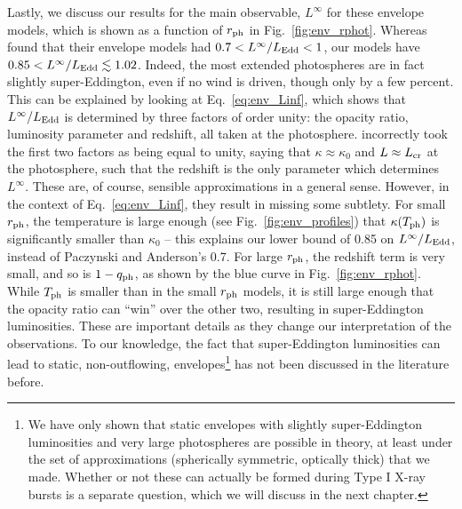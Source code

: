 \documentclass[../main.tex]{subfiles}
\begin{document}
Lastly, we discuss our results for the main observable, $L^\infty$ for these envelope models, which is shown as a function of $r_\text{ph}$ in Fig.~\ref{fig:env_rphot}. Whereas \citet{Paczynski1986a} found that their envelope models had $0.7<L^\infty/L_\text{Edd}<1$, our models have $0.85<L^\infty/L_\text{Edd}\lesssim 1.02$. Indeed, the most extended photospheres are in fact slightly super-Eddington, even if no wind is driven, though only by a few percent. This can be explained by looking at Eq.~\eqref{eq:env_Linf}, which shows that $L
^\infty/L_\text{Edd}$ is determined by three factors of order unity: the opacity ratio, luminosity parameter and redshift, all taken at the photosphere. \citet{Paczynski1986a} incorrectly took the first two factors as being equal to unity, saying that $\kappa\approx\kappa_0$ and $L\approx L_\text{cr}$ at the photosphere, such that the redshift is the only parameter which determines $L^\infty$. These are, of course, sensible approximations in a general sense. However, in the context of Eq.~\eqref{eq:env_Linf}, they result in missing some subtlety. For small $r_\text{ph}$, the temperature is large enough (see Fig.~\ref{fig:env_profiles}) that $\kappa(T_\text{ph})$ is significantly smaller than $\kappa_0$ -- this explains our lower bound of 0.85 on $L
^\infty/L_\text{Edd}$, instead of Paczynski and Anderson's 0.7. For large $r_\text{ph}$, the redshift term is very small, and so is $1-q_\text{ph}$, as shown by the blue curve in Fig.~\ref{fig:env_rphot}. While $T_\text{ph}$ is smaller than in the small $r_\text{ph}$ models, it is still large enough that the opacity ratio can ``win'' over the other two, resulting in super-Eddington luminosities. These are important details as they change our interpretation of the observations. To our knowledge, the fact that super-Eddington luminosities can lead to static, non-outflowing, envelopes\footnote{We have only shown that static envelopes with slightly super-Eddington luminosities and very large photospheres are possible in theory, at least under the set of approximations (spherically symmetric, optically thick) that we made. Whether or not these can actually be formed during Type I X-ray bursts is a separate question, which we will discuss in the next chapter.} has not been discussed in the literature before. %
\end{document}
